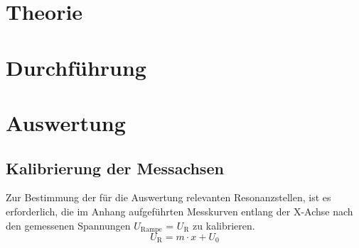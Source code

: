 

\section{Theorie}
\setcounter{page}{1}

\section{Durchführung}

\section{Auswertung}
\subsection{Kalibrierung der Messachsen}
\label{sec_Kalib}
Zur Bestimmung der für die Auswertung relevanten Resonanzstellen, ist es erforderlich, die im Anhang aufgeführten Messkurven entlang der X-Achse
nach den gemessenen Spannungen $U_\text{Rampe}$ = $U_\text{R}$ zu kalibrieren. 
\begin{equation}
 U_\text{R} = m\cdot x + U_0
\end{equation}

